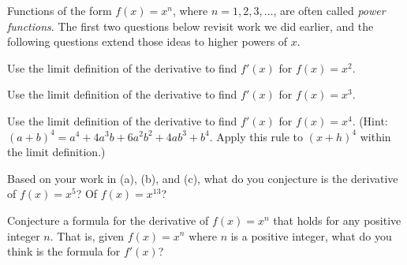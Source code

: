 \begin{pa} \label{PA:2.4}
Functions of the form $f(x) = x^n$, where $n = 1, 2, 3, \ldots$, are often called \emph{power functions}.  The first two questions below revisit work we did earlier, and the following questions extend those ideas to higher powers of $x$.
\ba
	\item Use the limit definition of the derivative to find $f'(x)$ for $f(x) = x^2$.
	\item Use the limit definition of the derivative to find $f'(x)$ for $f(x) = x^3$.
	\item Use the limit definition of the derivative to find $f'(x)$ for $f(x) = x^4$.  (Hint: $(a+b)^4 = a^4 + 4a^3b + 6a^2b^2 + 4ab^3 + b^4$.  Apply this rule to $(x+h)^4$ within the limit definition.)
	\item Based on your work in (a), (b), and (c), what do you conjecture is the derivative of $f(x) = x^5$?  Of $f(x) = x^{13}$?
	\item Conjecture a formula for the derivative of $f(x) = x^n$ that holds for any positive integer $n$.  That is, given $f(x) = x^n$ where $n$ is a positive integer, what do you think is the formula for $f'(x)$? 
\ea
\end{pa} \afterpa